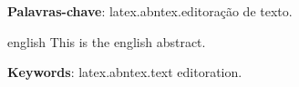 \documentclass[
	12pt,				%
	twoside,			%
	a4paper,			%
	english,			%
	brazil			%
	]{abntex2}
\begin{document}
\begin{dedicatoria}
   \vspace*{\fill}
   \centering
   \noindent
   \textit{} \vspace*{\fill}
\end{dedicatoria}
\begin{agradecimentos}

\end{agradecimentos}
\begin{epigrafe}
    \vspace*{\fill}
	\begin{flushright}
		\textit{}
	\end{flushright}
\end{epigrafe}
\setlength{\absparsep}{18pt} %
\begin{resumo}


 \textbf{Palavras-chave}: latex.abntex.editoração de texto.
\end{resumo}

\begin{resumo}[Abstract]
 \begin{otherlanguage*}{english}
   This is the english abstract.

   \vspace{\onelineskip}
 
   \noindent 
   \textbf{Keywords}: latex.abntex.text editoration.
 \end{otherlanguage*}
\end{resumo}
\listoffigures*
\cleardoublepage
\listoftables*
\cleardoublepage
\tableofcontents*
\cleardoublepage
\textual

\setcounter{page}{1}




%




\end{document}
